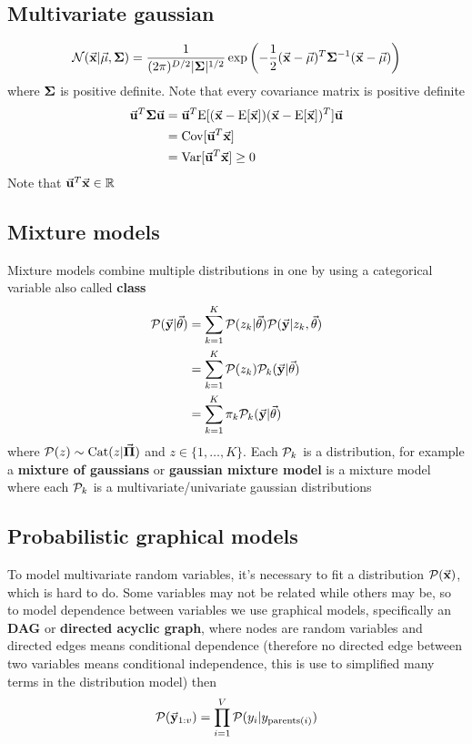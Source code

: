 \documentclass[../../main.tex]{subfiles}
\begin{document}
\subsection{Multivariate gaussian}
\begin{equation*}
    \normal(\vec{x}|\vec{\mu},\mat{\Sigma}) = \dfrac{1}{(2\pi)^{D/2} |\mat{\Sigma}|^{1/2}}
        \exp\left( -\frac{1}{2}(\vec{x}-\vec{\mu})^T \mat{\Sigma}^{-1} (\vec{x}-\vec{\mu}) \right)
\end{equation*}
where $\mathbf{\Sigma}$ is positive definite. Note that every covariance matrix is positive definite
\begin{align*}
    \vec{u}^T\mat{\Sigma}\vec{u}
    &= \vec{u}^T \e{ (\vec{x}-\e{\vec{x}}) (\vec{x}-\e{\vec{x}})^T } \vec{u}\\
    &= \cov{\vec{u}^T\vec{x}}\\
    &= \var{\vec{u}^T\vec{x}} \ge 0
\end{align*}
Note that $\vec{u}^T \vec{x}\in \real$

\subsection{Mixture models}
Mixture models combine multiple distributions in one by using a categorical variable also called \textbf{class}
\begin{align*}
    \p(\vec{y}|\vec{\theta}) 
    &= \sum_{k=1}^K \p(z_k|\vec{\theta}) \p(\vec{y}|z_k, \vec{\theta} )\\
    &= \sum_{k=1}^K \p(z_k) \p_k(\vec{y}|\vec{\theta} )\\
    &= \sum_{k=1}^K \pi_k \p_k(\vec{y}|\vec{\theta} )
\end{align*}
where $\p(z)\sim \mathrm{Cat}(z|\vec{\Pi})$ and $z\in\{ 1,\dots,K \}$. Each $\mathcal{P}_k$ is a distribution, for example a \textbf{mixture of gaussians} or \textbf{gaussian mixture model} is a mixture model where each $\mathcal{P}_k$ is a multivariate/univariate gaussian distributions

\subsection{Probabilistic graphical models}
To model multivariate random variables, it's necessary to fit a distribution $\p(\vec{x})$, which is hard to do. Some variables may not be related while others may be, so to model dependence between variables we use graphical models, specifically an \textbf{DAG} or \textbf{directed acyclic graph}, where nodes are random variables and directed edges means conditional dependence (therefore no directed edge between two variables means conditional independence, this is use to simplified many terms in the distribution model) then
\begin{equation*}
    \p(\vec{y}_{1:v}) = \prod_{i=1}^{V} \p(y_i|y_{\mathrm{parents}(i)})
\end{equation*}
\end{document}
